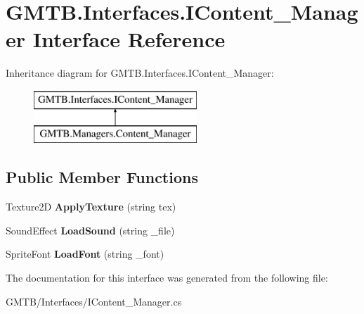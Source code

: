 \hypertarget{interface_g_m_t_b_1_1_interfaces_1_1_i_content___manager}{}\section{G\+M\+T\+B.\+Interfaces.\+I\+Content\+\_\+\+Manager Interface Reference}
\label{interface_g_m_t_b_1_1_interfaces_1_1_i_content___manager}
Inheritance diagram for G\+M\+T\+B.\+Interfaces.\+I\+Content\+\_\+\+Manager\+:\begin{figure}[H]
\begin{center}
\leavevmode
\includegraphics[height=2.000000cm]{interface_g_m_t_b_1_1_interfaces_1_1_i_content___manager}
\end{center}
\end{figure}
\subsection*{Public Member Functions}
\begin{DoxyCompactItemize}
\item 
\mbox{\label{interface_g_m_t_b_1_1_interfaces_1_1_i_content___manager_a0e0cadd66d75be65e888aa8a51f72bc7}} 
Texture2D {\bfseries Apply\+Texture} (string tex)
\item 
\mbox{\label{interface_g_m_t_b_1_1_interfaces_1_1_i_content___manager_a8cf65814869bbaeb3f14066091f17d79}} 
Sound\+Effect {\bfseries Load\+Sound} (string \+\_\+file)
\item 
\mbox{\label{interface_g_m_t_b_1_1_interfaces_1_1_i_content___manager_ad8d3dda86adac0ee94884a68a0af0483}} 
Sprite\+Font {\bfseries Load\+Font} (string \+\_\+font)
\end{DoxyCompactItemize}


The documentation for this interface was generated from the following file\+:\begin{DoxyCompactItemize}
\item 
G\+M\+T\+B/\+Interfaces/I\+Content\+\_\+\+Manager.\+cs\end{DoxyCompactItemize}
